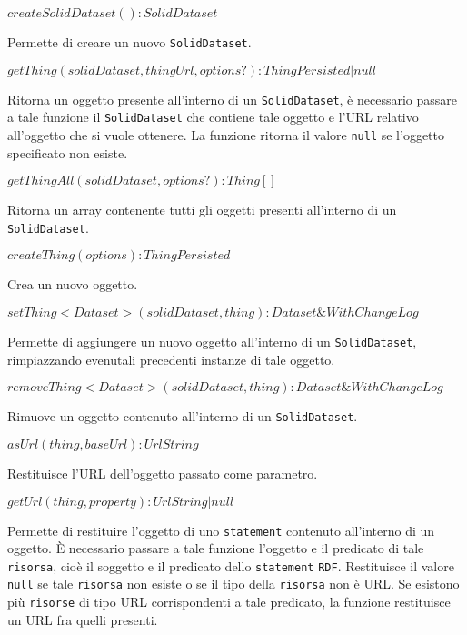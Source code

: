 \bigskip
\medskip

$createSolidDataset(): SolidDataset$

\bigskip

Permette di creare un nuovo {\tt SolidDataset}.

\bigskip
\medskip

$getThing(solidDataset, thingUrl, options?): ThingPersisted | null$

\bigskip

Ritorna un oggetto presente all'interno di un {\tt SolidDataset}, è necessario passare a tale funzione il {\tt SolidDataset} che contiene tale oggetto e l'URL relativo all'oggetto che si vuole ottenere. La funzione ritorna il valore {\tt null} se l'oggetto specificato non esiste.

\medskip
\bigskip

$getThingAll(solidDataset, options?): Thing[]$

\bigskip

Ritorna un array contenente tutti gli oggetti presenti all'interno di un {\tt SolidDataset}.

\bigskip
\medskip

$createThing(options): ThingPersisted$

\bigskip

Crea un nuovo oggetto.

\bigskip
\medskip

$setThing<Dataset>(solidDataset, thing): Dataset \& WithChangeLog$

\bigskip

Permette di aggiungere un nuovo oggetto all'interno di un {\tt SolidDataset}, rimpiazzando evenutali precedenti instanze di tale oggetto.

\bigskip
\medskip

$removeThing<Dataset>(solidDataset, thing): Dataset \& WithChangeLog$

\bigskip

Rimuove un oggetto contenuto all'interno di un {\tt SolidDataset}.

\bigskip
\medskip

$asUrl(thing, baseUrl): UrlString$

\bigskip

Restituisce l'URL dell'oggetto passato come parametro.

\bigskip
\medskip

$getUrl(thing, property): UrlString | null$

\bigskip

Permette di restituire l'oggetto di uno {\tt statement} contenuto all'interno di un oggetto. È necessario passare a tale funzione l'oggetto e il predicato di tale {\tt risorsa}, cioè il soggetto e il predicato dello {\tt statement} {\tt RDF}. Restituisce il valore {\tt null} se tale {\tt risorsa} non esiste o se il tipo della {\tt risorsa} non è URL. Se esistono più {\tt risorse} di tipo URL corrispondenti a tale predicato, la funzione restituisce un URL fra quelli presenti.

